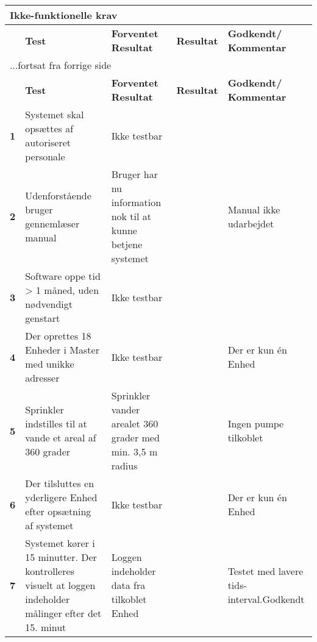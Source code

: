 \begin{center}
\begin{longtable}{|p{}|p{}|p{}|p{}|p{}|} %
\hline
\multicolumn{5}{|l|}{\textbf{Ikke-funktionelle krav}} \\ \hline
\multicolumn{1}{|c|}{} &
\textbf{Test} &
\textbf{Forventet \newline Resultat} &
\textbf{Resultat} &
\textbf{Godkendt/ \newline Kommentar} \\ \hline 
\endfirsthead

\multicolumn{5}{l}{...fortsat fra forrige side} \\ \hline 
\multicolumn{1}{|c|}{} &
\textbf{Test} &
\textbf{Forventet \newline Resultat} &
\textbf{Resultat} &
\textbf{Godkendt/ \newline Kommentar} \\ \hline 
\endhead

\textbf{1}	&Systemet skal opsættes af autoriseret personale
			&Ikke testbar
			&
			& \\ \hline 
			
\textbf{2}	&Udenforstående bruger gennemlæser manual
			&Bruger har nu information nok til at kunne betjene systemet
			&
			&Manual ikke udarbejdet \\ \hline 
			
\textbf{3}	&Software oppe tid > 1 måned, uden nødvendigt genstart
			&Ikke testbar
			&
			& \\ \hline 
			
\textbf{4}	&Der oprettes 18 Enheder i Master med unikke adresser
			&Ikke testbar 
			&
			&Der er kun én Enhed \\ \hline 
			
\textbf{5}	&Sprinkler indstilles til at vande et areal af 360 grader
			&Sprinkler vander arealet 360 grader med min. 3,5 m radius
			&
			&Ingen pumpe tilkoblet\\ \hline 
			
\textbf{6}	&Der tilsluttes en yderligere Enhed efter opsætning af systemet
			&Ikke testbar
			&
			&Der er kun én Enhed 	\\ \hline 
			
\textbf{7}	&Systemet kører i 15 minutter. Der kontrolleres visuelt at loggen indeholder målinger efter det 15. minut
			&Loggen indeholder data fra tilkoblet Enhed
			&
			&Testet med lavere tids-interval.\newline Godkendt\\ \hline 
			

\end{longtable}
\end{center}
